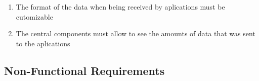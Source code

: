 \begin{enumerate}
        \begin{list}{}{}
            \item
        \end{list}

    \item The format of the data when being received by aplications must be cutomizable

        \begin{list}{}{}
            \item
        \end{list}

    \item The central components must allow to see the amounts of data that was sent to the aplications

        \begin{list}{}{}
            \item
        \end{list}

\end{enumerate}

\subsection{Non-Functional Requirements}

